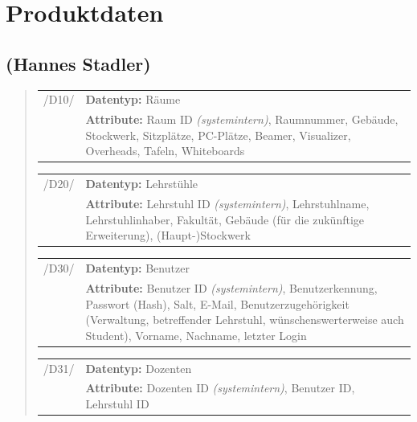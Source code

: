 \section{Produktdaten}
\label{sec:Produktdaten}

\subsection*{(Hannes Stadler)}

\begin{quote}
\begin{tabular}{p{1.5cm}p{14.5cm}}


	 /D10/	& \textbf{Datentyp:} Räume \\
				& \textbf{Attribute:} Raum ID \textsl{(systemintern)}, Raumnummer, Gebäude, Stockwerk, Sitzplätze, PC-Plätze, Beamer, Visualizer, Overheads, Tafeln, Whiteboards  \\[0.25cm]

\end{tabular}


\begin{tabular}{p{1.5cm}p{14.5cm}}
		
	 /D20/	& \textbf{Datentyp:} Lehrstühle \\
				& \textbf{Attribute:} Lehrstuhl ID \textsl{(systemintern)}, Lehrstuhlname, Lehrstuhlinhaber, Fakultät, Gebäude (für die zukünftige Erweiterung), (Haupt-)Stockwerk  \\[0.25cm]

\end{tabular}


\begin{tabular}{p{1.5cm}p{14.5cm}}
					
	 /D30/	& \textbf{Datentyp:} Benutzer \\
				& \textbf{Attribute:} Benutzer ID \textsl{(systemintern)}, Benutzerkennung, Passwort (Hash), Salt, E-Mail, Benutzerzugehörigkeit (Verwaltung, betreffender Lehrstuhl, wünschenswerterweise auch Student), Vorname, Nachname, letzter Login  \\[0.25cm]

\end{tabular}


\begin{tabular}{p{1.5cm}p{14.5cm}}
					
	 /D31/	& \textbf{Datentyp:} Dozenten \\
				& \textbf{Attribute:} Dozenten ID \textsl{(systemintern)}, Benutzer ID, Lehrstuhl ID  \\[0.25cm]


\end{tabular}
\end{quote}
